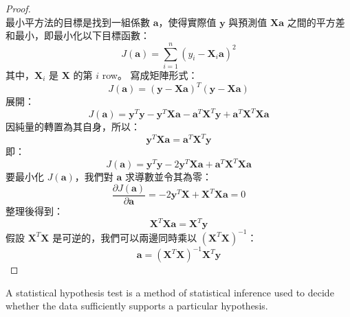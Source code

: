 \documentclass[a4paper,12pt]{report}
\begin{document}
\begin{proof}\mbox{}\\
最小平方法的目標是找到一組係數 \(\mathbf{a}\)，使得實際值 \(\mathbf{y}\) 與預測值 \(\mathbf{X}\mathbf{a}\) 之間的平方差和最小，即最小化以下目標函數：
\[
J(\mathbf{a}) = \sum_{i=1}^n (y_i - \mathbf{X}_i \mathbf{a})^2
\]
其中，\(\mathbf{X}_i\) 是 \(\mathbf{X}\) 的第 \(i\) row。
寫成矩陣形式：
\[
J(\mathbf{a}) = (\mathbf{y} - \mathbf{X}\mathbf{a})^T (\mathbf{y} - \mathbf{X}\mathbf{a})
\]
展開：
\[
J(\mathbf{a}) = \mathbf{y}^T\mathbf{y} - \mathbf{y}^T\mathbf{X}\mathbf{a} - \mathbf{a}^T\mathbf{X}^T\mathbf{y} + \mathbf{a}^T\mathbf{X}^T\mathbf{X}\mathbf{a}
\]
因純量的轉置為其自身，所以：
\[\mathbf{y}^T\mathbf{X}\mathbf{a}=\mathbf{a}^T\mathbf{X}^T\mathbf{y}\]
即：
\[
J(\mathbf{a}) = \mathbf{y}^T\mathbf{y} - 2\mathbf{y}^T\mathbf{X}\mathbf{a} + \mathbf{a}^T\mathbf{X}^T\mathbf{X}\mathbf{a}
\]
要最小化 \(J(\mathbf{a})\)，我們對 \(\mathbf{a}\) 求導數並令其為零：
\[
\frac{\partial J(\mathbf{a})}{\partial \mathbf{a}} = -2\mathbf{y}^T\mathbf{X} + \mathbf{X}^T \mathbf{X}\mathbf{a} = 0
\]
整理後得到：
\[
\mathbf{X}^T \mathbf{X} \mathbf{a} = \mathbf{X}^T \mathbf{y}
\]
假設 \(\mathbf{X}^T \mathbf{X}\) 是可逆的，我們可以兩邊同時乘以 \((\mathbf{X}^T \mathbf{X})^{-1}\)：
\[
\mathbf{a} = (\mathbf{X}^T \mathbf{X})^{-1} \mathbf{X}^T \mathbf{y}
\]
\end{proof}
A statistical hypothesis test is a method of statistical inference used to decide whether the data sufficiently supports a particular hypothesis.
\end{document}
